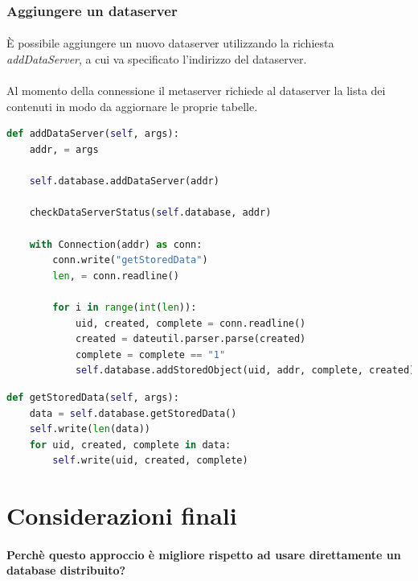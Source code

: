 \documentclass{article}
\begin{document}
\subsubsection{Aggiungere un dataserver}

\paragraph{} È possibile aggiungere un nuovo dataserver utilizzando la richiesta \emph{addDataServer}, a cui va specificato l'indirizzo del dataserver. 

\paragraph{} Al momento della connessione il metaserver richiede al dataserver la lista dei contenuti in modo da aggiornare le proprie tabelle. 

\begin{lstlisting}[language=Python, title=Metaserver]
def addDataServer(self, args):
    addr, = args

    self.database.addDataServer(addr)

    checkDataServerStatus(self.database, addr)

    with Connection(addr) as conn:
        conn.write("getStoredData")
        len, = conn.readline()

        for i in range(int(len)):
            uid, created, complete = conn.readline()
            created = dateutil.parser.parse(created)
            complete = complete == "1"
            self.database.addStoredObject(uid, addr, complete, created)
\end{lstlisting}

\begin{lstlisting}[language=Python, title=Dataserver]
def getStoredData(self, args):
    data = self.database.getStoredData()
    self.write(len(data))
    for uid, created, complete in data:
        self.write(uid, created, complete)
\end{lstlisting}


\section{Considerazioni finali}

\paragraph{Perchè questo approccio è migliore rispetto ad usare direttamente un database distribuito?} 
\end{document}
